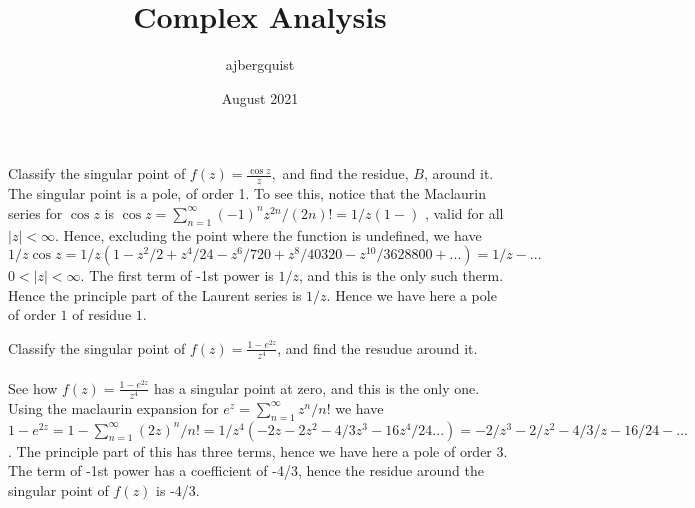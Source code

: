 \documentclass{article}
\title{Complex Analysis}
\author{ajbergquist }
\date{August 2021}
\theoremstyle{definition}
\newcommand{\infsum}{\sum_{n = 1}^{\infty}}
\newcommand{\cs}[1]{\color{blue}{#1}\normalcolor}
\begin{document}
 Classify the singular point of $f(z) = \frac{\cos z}{z},$ and find the residue, $B$, around it.\\

 The singular point is a pole, of order 1. To see this, notice that the Maclaurin series for $\cos z$ is $\cos z = \infsum (-1)^nz^{2n}/(2n)! = 1/z(1-)$ \cs{What?}, valid for all $|z| < \infty$. Hence, excluding the point where the function is undefined, we have $1/z\cos z = 1/z(1-z^2/2 + z^4/24 -z^6/720 + z^8/40320-z^{10}/3628800+...) = 1/z - ...$ $0< |z| < \infty$. The first term of -1st power is $1/z$, and this is the only such therm. Hence the principle part of the Laurent series is $1/z$. Hence we have here a pole of order $1$ of residue $1$.\\

\cs{5/5}

 Classify the singular point of $f(z) = \frac{1-e^{2z}}{z^4}$, and find the resudue around it.\\


\\
 See how $f(z) = \frac{1-e^{2z}}{z^4}$ has a singular point at zero, and this is the only one. Using the maclaurin expansion for $e^{z} = \infsum z^n/n!$ we have $1-e^{2z} = 1- \infsum(2z)^n/n! = 1/z^4(-2z - 2z^2 - 4/3z^3 - 16z^4/24...) =  -2/z^3 - 2/z^2 - 4/3/z - 16/24 -...$. The principle part of this has three terms, hence we have here a pole of order 3. The term of -1st power has a coefficient of -4/3, hence the residue around the singular point of $f(z)$ is -4/3.\\

\cs{5/5}

\cs{Sec 79: 10/10}
\end{document}
